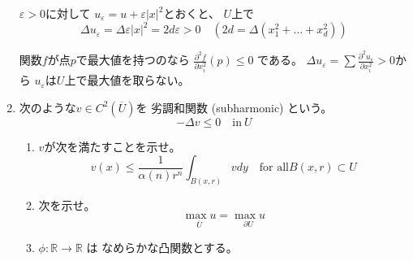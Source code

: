 \documentclass[12pt,b5paper]{ltjsarticle}
\begin{document}
\begin{enumerate}
      $\varepsilon>0$に対して
      $u_{\varepsilon}=u+\varepsilon \lvert x \rvert^{2}$とおくと、
      $U$上で
      \begin{equation}
       \Delta u_{\varepsilon}
        = \Delta \varepsilon \lvert x \rvert^{2}
        = 2d\varepsilon
        >0
        \quad
        (2d=\Delta (x_{1}^{2}+\dots +x_{d}^{2}))
      \end{equation}

      関数$f$が点$p$で最大値を持つのなら
      $\frac{\partial^{2} f}{\partial x_{i}^{2}}(p) \leq 0$
      である。
      $\Delta u_{\varepsilon} = \sum \frac{\partial^{2} u_{\varepsilon}}{\partial x_{i}^{2}} > 0$から
      $u_{\varepsilon}$は$U$上で最大値を取らない。


      \hrulefill

 \item

      次のような$v\in C^{2}(\overline{U})$を 劣調和関数 (subharmonic) という。
      \begin{equation}
       -\Delta v \leq 0 \quad \text{in}\: U
      \end{equation}


      \begin{enumerate}
       \item

            $v$が次を満たすことを示せ。
            \begin{equation}
             v(x) \leq \frac{1}{\alpha(n)r^{n}}
              \int_{B(x,r)} v dy
              \quad \text{for all} B(x,r) \subset U
            \end{equation}

            \dotfill



            \hrulefill

       \item

            次を示せ。
            \begin{equation}
             \underset{\overline{U}}{\max {u}}
              = \underset{\partial{U}}{\max {u}}
            \end{equation}

            \dotfill



            \hrulefill

       \item

            $\phi : \mathbb{R}\to\mathbb{R}$
            は
            なめらかな凸関数とする。


\end{enumerate}
\end{enumerate}
\end{document}
